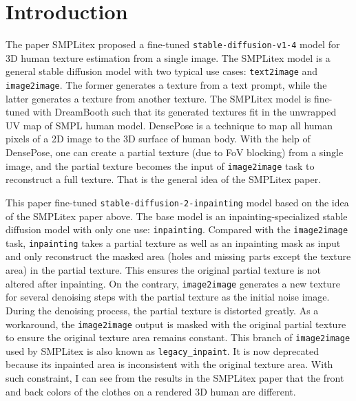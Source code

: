 \documentclass[acmtog]{acmart}
\begin{document}


\maketitle

\section{Introduction}

The paper SMPLitex \cite{casas2023smplitex} proposed a fine-tuned \texttt{stable-diffusion-v1-4} model for 3D human texture estimation from a single image. The SMPLitex model is a general stable diffusion model with two typical use cases: \texttt{text2image} and \texttt{image2image}. The former generates a texture from a text prompt, while the latter generates a texture from another texture. The SMPLitex model is fine-tuned with DreamBooth such that its generated textures fit in the unwrapped UV map of SMPL human model. DensePose \cite{guler2018densepose} is a technique to map all human pixels of a 2D image to the 3D surface of human body. With the help of DensePose, one can create a partial texture (due to FoV blocking) from a single image, and the partial texture becomes the input of \texttt{image2image} task to reconstruct a full texture. That is the general idea of the SMPLitex paper.

This paper fine-tuned \texttt{stable-diffusion-2-inpainting} model based on the idea of the SMPLitex paper above. The base model is an inpainting-specialized stable diffusion model with only one use: \texttt{inpainting}. Compared with the \texttt{image2image} task, \texttt{inpainting} takes a partial texture as well as an inpainting mask as input and only reconstruct the masked area (holes and missing parts except the texture area) in the partial texture. This ensures the original partial texture is not altered after inpainting. On the contrary, \texttt{image2image} generates a new texture for several denoising steps with the partial texture as the initial noise image. During the denoising process, the partial texture is distorted greatly. As a workaround, the \texttt{image2image} output is masked with the original partial texture to ensure the original texture area remains constant. This branch of \texttt{image2image} used by SMPLitex is also known as \texttt{legacy\_inpaint}. It is now deprecated because its inpainted area is inconsistent with the original texture area. With such constraint, I can see from the results in the SMPLitex paper that the front and back colors of the clothes on a rendered 3D human are different.
\end{document}
